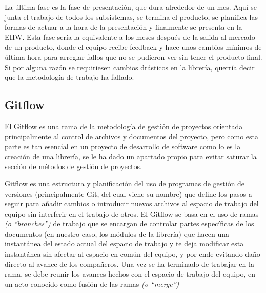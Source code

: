 \documentclass{report}
\begin{document}
La última fase es la fase de presentación, que dura alrededor de un mes. Aquí se junta el trabajo de todos los subsistemas, se termina el producto, se planifica las formas de actuar a la hora de la presentación y finalmente se presenta en la EHW. Esta fase sería la equivalente a los meses después de la salida al mercado de un producto, donde el equipo recibe feedback y hace unos cambios mínimos de última hora para arreglar fallos que no se pudieron ver sin tener el producto final. Si por alguna razón se requiriesen cambios drásticos en la librería, querría decir que la metodología de trabajo ha fallado. 

\subsection{Gitflow}
El Gitflow es una rama de la metodología de gestión de proyectos orientada principalmente al control de archivos y documentos del proyecto, pero como esta parte es tan esencial en un proyecto de desarrollo de software como lo es la creación de una librería, se le ha dado un apartado propio para evitar saturar la sección de métodos de gestión de proyectos. 
\par \vspace{0.3 cm}
Gitflow es una estructura y planificación del uso de programas de gestión de versiones (principalmente Git, del cual viene su nombre) que define los pasos a seguir para añadir cambios o introducir nuevos archivos al espacio de trabajo del equipo sin interferir en el trabajo de otros.
El Gitflow se basa en el uso de ramas \textit{(o ``branches'')} de trabajo que se encargan de controlar partes específicas de los documentos (en nuestro caso, los módulos de la librería) que hacen una instantánea del estado actual del espacio de trabajo y te deja modificar esta instantánea sin afectar al espacio en común del equipo, y por ende evitando daño directo al avance de los compañeros. Una vez se ha terminado de trabajar en la rama, se debe reunir los avances hechos con el espacio de trabajo del equipo, en un acto conocido como fusión de las ramas \textit{(o ``merge'')}\par \vspace{0.3 cm}
\end{document}
